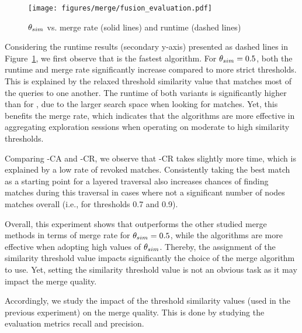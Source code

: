 \begin{figure}[b]
\centering
\texttt{[image: figures/merge/fusion\_evaluation.pdf]}
\vspace{-0.5em}
\caption{$\theta_{sim}$ vs. merge rate (solid lines) and runtime (dashed lines)}
\label{fig:threshold}
\end{figure}



Considering the runtime results (secondary y-axis) presented as dashed lines in Figure~\ref{fig:threshold}, we first observe that \rlm{} is the fastest algorithm. 
For $\theta_{sim} = 0.5$, both the runtime and merge rate significantly increase compared to more strict thresholds. This is explained by the relaxed threshold similarity value that matches most of the queries to one another.
The runtime of both \mlm{} variants is significantly higher than for \rlm{}, due to the larger search space when looking for matches. Yet, this benefits the merge rate, which indicates that the \mlm{} algorithms are more effective in aggregating exploration sessions when operating on moderate to high similarity thresholds. 

Comparing \mlm{}-CA and \mlm{}-CR, we observe that \mlm-CR takes slightly more time, which is explained by a low rate of revoked matches. 
Consistently taking the best match as a starting point for a layered traversal also increases chances of finding matches during this traversal in cases where not a significant number of nodes matches overall (i.e., for thresholds 0.7 and 0.9). 

Overall, this experiment shows that \rlm{} outperforms the other studied  merge methods in terms of merge rate for $\theta_{sim} = 0.5$, while the \mlm{} algorithms are more effective when adopting high values of $\theta_{sim}$. 
Thereby, the assignment of the similarity threshold value impacts significantly the choice of the merge algorithm to use. 
Yet, setting the similarity threshold value is not an obvious task as it may impact the merge quality. 

Accordingly, we study the impact of the threshold similarity values (used in the previous experiment) on the merge quality. 
This is done by studying the evaluation metrics recall and precision. %



